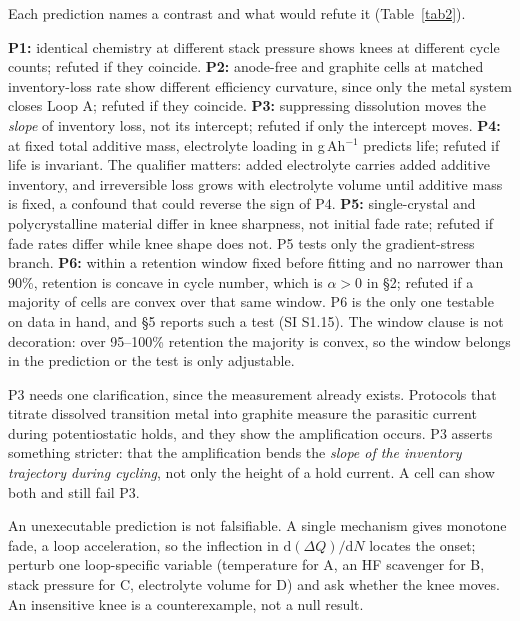 \documentclass[AMA,Times2COL]{WileyNJDv5}
\begin{document}
Each prediction names a contrast and what would refute it (Table~\ref{tab2}).

\textbf{P1:} identical chemistry at different stack pressure shows knees at different cycle counts; refuted if they coincide.\cite{wang2026interplay,barai2017effect} \textbf{P2:} anode-free and graphite cells at matched inventory-loss rate show different efficiency curvature, since only the metal system closes Loop A; refuted if they coincide.\cite{louli2019exploring} \textbf{P3:} suppressing dissolution moves the \emph{slope} of inventory loss, not its intercept; refuted if only the intercept moves. \textbf{P4:} at fixed total additive mass, electrolyte loading in g\,Ah$^{-1}$ predicts life; refuted if life is invariant. The qualifier matters: added electrolyte carries added additive inventory, and irreversible loss grows with electrolyte volume until additive mass is fixed, a confound that could reverse the sign of P4.\cite{lechtenfeld2024electrolyte} \textbf{P5:} single-crystal and polycrystalline material differ in knee sharpness, not initial fade rate; refuted if fade rates differ while knee shape does not.\cite{wheatcroft2024situ} P5 tests only the gradient-stress branch. \textbf{P6:} within a retention window fixed before fitting and no narrower than 90\%, retention is concave in cycle number, which is $\alpha > 0$ in \S2; refuted if a majority of cells are convex over that same window. P6 is the only one testable on data in hand, and \S5 reports such a test (SI S1.15). The window clause is not decoration: over 95--100\% retention the majority is convex, so the window belongs in the prediction or the test is only adjustable.

P3 needs one clarification, since the measurement already exists. Protocols that titrate dissolved transition metal into graphite measure the parasitic current during potentiostatic holds,\cite{meunier2022electrochemical} and they show the amplification occurs. P3 asserts something stricter: that the amplification bends the \emph{slope of the inventory trajectory during cycling}, not only the height of a hold current. A cell can show both and still fail P3.

An unexecutable prediction is not falsifiable. A single mechanism gives monotone fade, a loop acceleration, so the inflection in $\mathrm{d}(\Delta Q)/\mathrm{d}N$ locates the onset; perturb one loop-specific variable (temperature for A, an HF scavenger for B, stack pressure for C, electrolyte volume for D) and ask whether the knee moves.\cite{wang2026interplay,louli2019exploring} An insensitive knee is a counterexample, not a null result.
\end{document}
